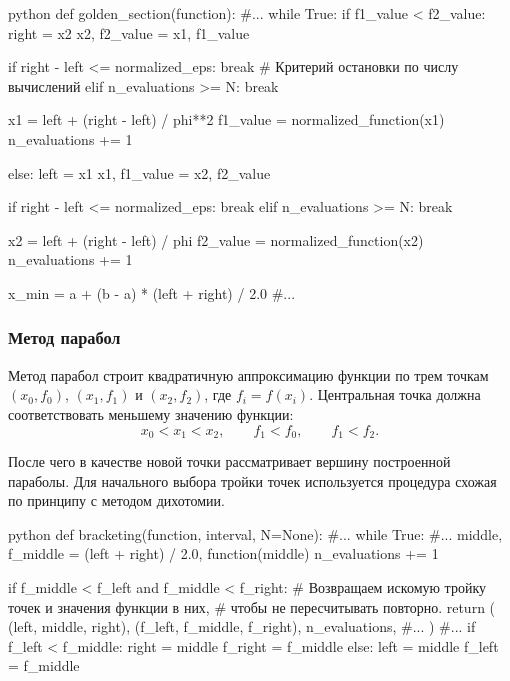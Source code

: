 \begin{mintedbox}{python}
def golden_section(function):
    #...
    while True:
        if f1_value < f2_value:
            right = x2
            x2, f2_value = x1, f1_value

            if right - left <= normalized_eps:
                break
            # Критерий остановки по числу вычислений
            elif n_evaluations >= N:
                break

            x1 = left + (right - left) / phi**2
            f1_value = normalized_function(x1)
            n_evaluations += 1

        else:
            left = x1
            x1, f1_value = x2, f2_value

            if right - left <= normalized_eps:
                break
            elif n_evaluations >= N:
                break

            x2 = left + (right - left) / phi
            f2_value = normalized_function(x2)
            n_evaluations += 1

    x_min = a + (b - a) * (left + right) / 2.0
    #...
\end{mintedbox}

\newpage

\subsubsection{Метод парабол}

Метод парабол строит квадратичную аппроксимацию функции по трем точкам
\((x_0, f_0)\), \((x_1, f_1)\) и \((x_2, f_2)\), где
\(f_i = f(x_i)\). Центральная точка должна соответствовать меньшему
значению функции:
\[
x_0 < x_1 < x_2, \qquad f_1 < f_0, \qquad f_1 < f_2.
\]

После чего в качестве новой точки
рассматривает вершину построенной параболы. Для начального выбора тройки точек
используется процедура схожая по принципу с методом дихотомии.

\begin{mintedbox}{python}
def bracketing(function, interval, N=None):
    #...
    while True:
        #...
        middle, f_middle = (left + right) / 2.0, function(middle)
        n_evaluations += 1

        if f_middle < f_left and f_middle < f_right:
            # Возвращаем искомую тройку точек и значения функции в них,
            # чтобы не пересчитывать повторно.
            return (
                (left, middle, right),
                (f_left, f_middle, f_right),
                n_evaluations,
                #...
            )
        #...
        if f_left < f_middle:
            right = middle
            f_right = f_middle
        else:
            left = middle
            f_left = f_middle
\end{mintedbox}

